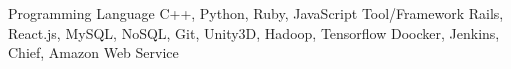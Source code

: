 \begin{cvhonors}
  \cvhonor
    {Programming Language}
    {C++, Python, Ruby, JavaScript }
    {}
    {}
    \cvhonor
    {Tool/Framework}
    {Rails, React.js, MySQL, NoSQL, Git, Unity3D, Hadoop, Tensorflow}
    {}
    {}
    {Doocker, Jenkins, Chief, Amazon Web Service}
    {}
    {}
\end{cvhonors}

